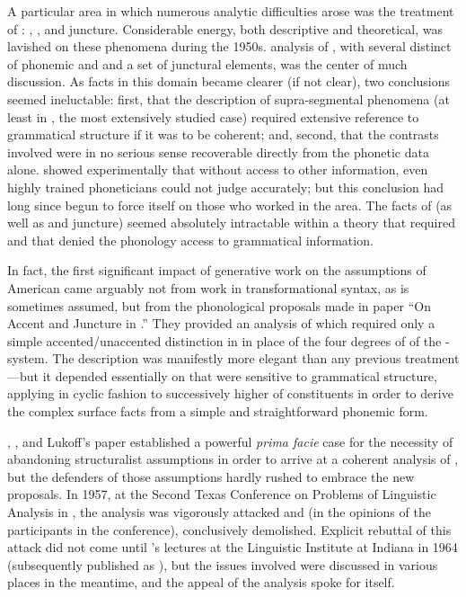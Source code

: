 A particular area in which numerous analytic difficulties arose was
the treatment of : , , and
juncture. Considerable energy, both descriptive and theoretical, was
lavished on these phenomena during the
1950s.  analysis of , with
several distinct  of phonemic  and  and a set of
junctural elements, was the center of much discussion. As facts in
this domain became clearer (if not clear), two conclusions seemed
ineluctable: first, that the description of supra-segmental phenomena
(at least in , the most extensively studied case) required
extensive reference to grammatical structure if it was to be coherent;
and, second, that the contrasts involved were in no serious sense
recoverable directly from the phonetic data alone.
\citet{lieberman65:intonation} showed experimentally that without
access to other information, even highly trained phoneticians could
not judge  accurately; but this conclusion had long since begun
to force itself on those who worked in the area. The facts of 
(as well as  and juncture) seemed absolutely intractable within a
theory that required  and that denied the phonology
access to grammatical information.

In fact, the first significant impact of generative work on the
assumptions of American  came arguably not from work in
transformational syntax, as is sometimes assumed, but from the
phonological proposals made in  paper
``On Accent and Juncture in .'' They provided an analysis of
  which required only a simple accented/unaccented
distinction in  in place of the four
degrees of  of the {\Trager}-{\Smith} system. The description was
manifestly more elegant than any previous treatment—but it depended
essentially on  that were sensitive to grammatical structure,
applying in cyclic fashion to successively higher  of
constituents in order to derive the complex surface facts from a
simple and straightforward phonemic form.

{\Chomsky}, {\Halle}, and Lukoff's paper established a powerful \emph{prima facie}
case for the necessity of abandoning structuralist assumptions in
order to arrive at a coherent analysis of  , but
the defenders of those assumptions hardly rushed to embrace the new
proposals. In 1957, at the Second Texas Conference on Problems of
Linguistic Analysis in , the analysis was vigorously attacked
and (in the opinions of the participants in the conference),
conclusively demolished. Explicit rebuttal of this attack did not come
until {\Chomsky}'s lectures at the {Linguistic Institute} at Indiana in 1964
(subsequently published as \citealt{chomsky66:topics}), but the
issues involved were discussed in various places in the meantime, and
the appeal of the analysis spoke for itself.

